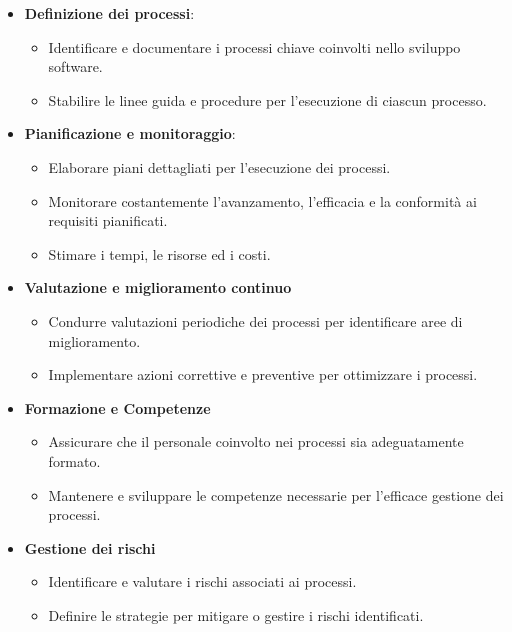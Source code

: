 \begin{itemize}
    \item \textbf{Definizione dei processi}:
        \begin{itemize}
            \item Identificare e documentare i processi chiave coinvolti nello sviluppo software.
            \item Stabilire le linee guida e procedure per l'esecuzione di ciascun processo.
        \end{itemize}
    \item \textbf{Pianificazione e monitoraggio}:
        \begin{itemize}
            \item Elaborare piani dettagliati per l'esecuzione dei processi.
            \item Monitorare costantemente l'avanzamento, l'efficacia e la conformità ai requisiti pianificati.
            \item Stimare i tempi, le risorse ed i costi.
        \end{itemize}
    \item \textbf{Valutazione e miglioramento continuo}
        \begin{itemize}
            \item Condurre valutazioni periodiche dei processi per identificare aree di miglioramento.
            \item Implementare azioni correttive e preventive per ottimizzare i processi.
        \end{itemize}
    \item \textbf{Formazione e Competenze}
        \begin{itemize}
            \item Assicurare che il personale coinvolto nei processi sia adeguatamente formato.
            \item Mantenere e sviluppare le competenze necessarie per l'efficace gestione dei processi.
        \end{itemize}
    \item \textbf{Gestione dei rischi}
        \begin{itemize}
            \item Identificare e valutare i rischi associati ai processi.
            \item Definire le strategie per mitigare o gestire i rischi identificati.
        \end{itemize}
\end{itemize}
